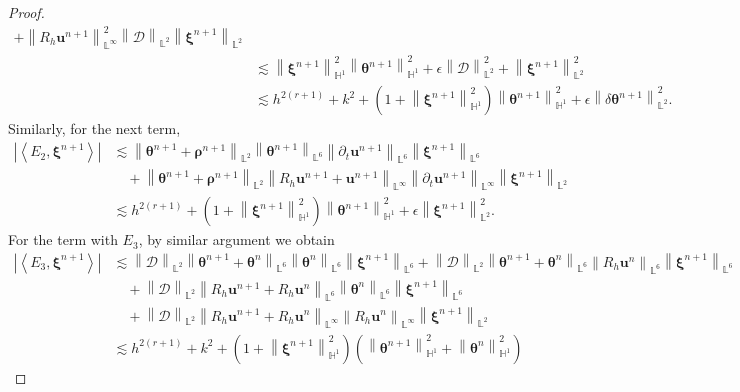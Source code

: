 \documentclass[11pt, reqno]{amsart}
\theoremstyle{definition}
\theoremstyle{remark}
\numberwithin{equation}{section}
\newcommand{\bff}{\boldsymbol}
\newcommand{\bb}{\mathbb}
\newcommand{\norm}[2]{\left\|{#1}\right\|_{#2}}
\newcommand{\inpro}[2]{\left\langle#1,#2\right\rangle}
\begin{document}
\begin{proof}
\begin{align}
		+
		\norm{R_h \bff{u}^{n+1}}{\bb{L}^\infty}^2 \norm{\mathcal{D}}{\bb{L}^2} \norm{\bff{\xi}^{n+1}}{\bb{L}^2}
		\\
		\nonumber
		&\lesssim
		\norm{\bff{\xi}^{n+1}}{\bb{H}^1}^2 \norm{\bff{\theta}^{n+1}}{\bb{H}^1}^2
		+
		\epsilon \norm{\mathcal{D}}{\bb{L}^2}^2
		+
		\norm{\bff{\xi}^{n+1}}{\bb{L}^2}^2
		\\
		&\lesssim
		h^{2(r+1)}+k^2
		+
		\left(1+ \norm{\bff{\xi}^{n+1}}{\bb{H}^1}^2\right) \norm{\bff{\theta}^{n+1}}{\bb{H}^1}^2
		+
		\epsilon \norm{\delta \bff{\theta}^{n+1}}{\bb{L}^2}^2.
	\end{align}
	Similarly, for the next term,
	\begin{align}\label{equ:E2 euler}
		\nonumber
		\left|\inpro{E_2}{\bff{\xi}^{n+1}}\right|
		&\lesssim
		\norm{\bff{\theta}^{n+1}+\bff{\rho}^{n+1}}{\bb{L}^2}
		\norm{\bff{\theta}^{n+1}}{\bb{L}^6}
		\norm{\partial_t \bff{u}^{n+1}}{\bb{L}^6}
		\norm{\bff{\xi}^{n+1}}{\bb{L}^6}
		\\
		\nonumber
		&\quad
		+
		\norm{\bff{\theta}^{n+1}+\bff{\rho}^{n+1}}{\bb{L}^2}
		\norm{R_h \bff{u}^{n+1}+\bff{u}^{n+1}}{\bb{L}^\infty}
		\norm{\partial_t \bff{u}^{n+1}}{\bb{L}^\infty}
		\norm{\bff{\xi}^{n+1}}{\bb{L}^2}
		\\
		&\lesssim
		h^{2(r+1)}
		+
		\left(1+ \norm{\bff{\xi}^{n+1}}{\bb{H}^1}^2\right) \norm{\bff{\theta}^{n+1}}{\bb{H}^1}^2
		+
		\epsilon \norm{\bff{\xi}^{n+1}}{\bb{L}^2}^2.
	\end{align}
	For the term with $E_3$, by similar argument we obtain
	\begin{align}\label{equ:E3 euler}
		\nonumber
		\left|\inpro{E_3}{\bff{\xi}^{n+1}}\right|
		&\lesssim
		\norm{\mathcal{D}}{\bb{L}^2}
		\norm{\bff{\theta}^{n+1}+\bff{\theta}^n}{\bb{L}^6}
		\norm{\bff{\theta}^n}{\bb{L}^6}
		\norm{\bff{\xi}^{n+1}}{\bb{L}^6}
		+
		\norm{\mathcal{D}}{\bb{L}^2}
		\norm{\bff{\theta}^{n+1}+\bff{\theta}^n}{\bb{L}^6}
		\norm{R_h \bff{u}^n}{\bb{L}^6}
		\norm{\bff{\xi}^{n+1}}{\bb{L}^6}
		\\
		\nonumber
		&\quad
		+
		\norm{\mathcal{D}}{\bb{L}^2}
		\norm{R_h \bff{u}^{n+1}+R_h\bff{u}^n}{\bb{L}^6}
		\norm{\bff{\theta}^n}{\bb{L}^6}
		\norm{\bff{\xi}^{n+1}}{\bb{L}^6}
		\\
		\nonumber
		&\quad
		+
		\norm{\mathcal{D}}{\bb{L}^2}
		\norm{R_h \bff{u}^{n+1}+R_h\bff{u}^n}{\bb{L}^\infty}
		\norm{R_h \bff{u}^n}{\bb{L}^\infty}
		\norm{\bff{\xi}^{n+1}}{\bb{L}^2}
		\\
		&\lesssim
		h^{2(r+1)} + k^2
		+
		\left(1+ \norm{\bff{\xi}^{n+1}}{\bb{H}^1}^2\right) \left(\norm{\bff{\theta}^{n+1}}{\bb{H}^1}^2 + \norm{\bff{\theta}^n}{\bb{H}^1}^2 \right)

\end{align}
\end{proof}
\end{document}
